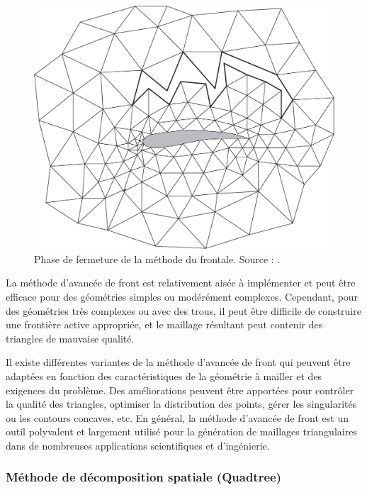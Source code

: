 \begin{figure}[!h]
    \centering
    \includegraphics[scale=0.35]{images/moving front method.png}
    \caption{Phase de fermeture de la méthode du frontale. Source : \cite{baker2005mesh}.}
    \label{fig:moving_front_method}
\end{figure}


La méthode d'avancée de front est relativement aisée à implémenter et peut être efficace pour des géométries simples ou modérément complexes. Cependant, pour des géométries très complexes ou avec des trous, il peut être difficile de construire une frontière active appropriée, et le maillage résultant peut contenir des triangles de mauvaise qualité.

Il existe différentes variantes de la méthode d'avancée de front qui peuvent être adaptées en fonction des caractéristiques de la géométrie à mailler et des exigences du problème. Des améliorations peuvent être apportées pour contrôler la qualité des triangles, optimiser la distribution des points, gérer les singularités ou les contours concaves, etc. En général, la méthode d'avancée de front est un outil polyvalent et largement utilisé pour la génération de maillages triangulaires dans de nombreuses applications scientifiques et d'ingénierie.

\subsubsection{Méthode de décomposition spatiale (Quadtree)}

